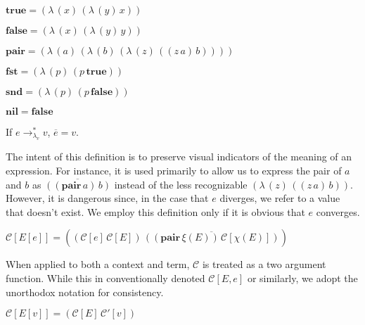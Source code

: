 \documentclass[ms,electronic,twosidetoc,letterpaper,chaptercenter,parttop]{byumsphd}
\newcommand{\true}{\mathbf{true}}
\newcommand{\false}{\mathbf{false}}
\newcommand{\nil}{\mathbf{nil}}
\newcommand{\pair}[2]{((\mathbf{pair}\,#1)\,#2)}
\newcommand{\eval}[1]{\overline{#1}}
\newcommand{\lvrrs}{\rightarrow_{\lambda_v}^{*}}
\newcommand{\C}[1]{\mathcal{C}[#1]}
\newcommand{\Ct}[2]{\mathcal{C}[#1,#2]}
\newcommand{\Cp}[1]{\mathcal{C}'[#1]}
\newcommand{\abs}[2]{(\lambda\,(#1)\,#2)}
\newcommand{\app}[2]{(#1\,#2)}
\begin{document}

\begin{defn}
$\true=\abs{x}{\abs{y}{x}}$
\end{defn}

\begin{defn}
$\false=\abs{x}{\abs{y}{y}}$
\end{defn}

\begin{defn}
$\mathbf{pair}=\abs{a}{\abs{b}{\abs{z}{\app{\app{z}{a}}{b}}}}$
\end{defn}

\begin{defn}
$\mathbf{fst}=\abs{p}{\app{p}{\true}}$
\end{defn}

\begin{defn}
$\mathbf{snd}=\abs{p}{\app{p}{\false}}$
\end{defn}

\begin{defn}
$\nil=\false$
\end{defn}

\begin{defn}
If $e\lvrrs v$, $\eval{e}=v$.

The intent of this definition is to preserve visual indicators of the meaning of an expression. For instance, it is used primarily to allow us to express the pair of $a$ and $b$ as $\eval{\pair{a}{b}}$ instead of the less recognizable $\abs{z}{\app{\app{z}{a}}{b}}$. However, it is dangerous since, in the case that $e$ diverges, we refer to a value that doesn't exist. We employ this definition only if it is obvious that $e$ converges.
\end{defn}

\begin{defn}
$\C{E[e]}=\app{\app{\C{e}}{\C{E}}}{\eval{\pair{\xi(E)}{\C{\chi(E)}}}}$

When applied to both a context and term, $\mathcal{C}$ is treated as a two argument function. While this in conventionally denoted $\Ct{E}{e}$ or similarly, we adopt the unorthodox notation for consistency. 
\end{defn}

\begin{defn}
$\C{E[v]}=\app{\C{E}}{\Cp{v}}$
\end{defn}

\newenvironment{schemedefn}[1]{\begin{defn}$#1$\begin{singlespace}}{\end{singlespace}\end{defn}}
\newenvironment{namedschemedefn}[2]{\begin{defn}\label{#1}$#2$\begin{singlespace}}{\end{singlespace}\end{defn}}
\end{document}

